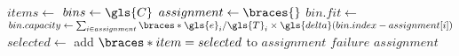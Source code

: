 \begin{algorithmic}[1]
    \State $items\gets$
    \State $bins\gets\gls{C}$
    \State $assignment\gets\braces{}$
            \State $bin.fit\gets$ 
            \State $bin.capacity\gets\sum_{i\in assignment}\braces*{\gls{e}_i/\gls{T}_i\times\gls{delta}(bin.index-assignment[i])}$ 
        \EndFor
        \State $selected\gets$ 
            \State add $\braces*{item=selected}$ to $assignment$
        \Else
            \State \Return $failure$
        \EndIf
	\EndFor
	\State \Return $assignment$
	\EndProcedure
\end{algorithmic}
